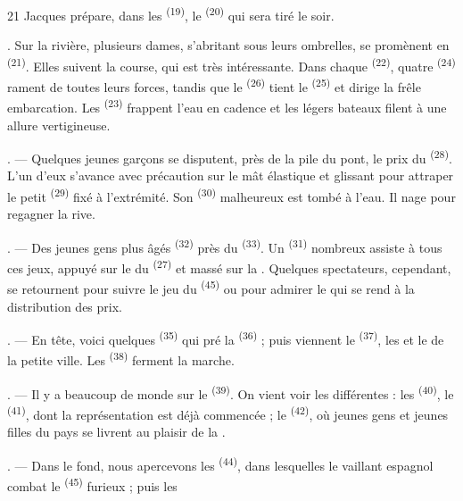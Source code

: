 \begin{VUpage}[23]{21}
\VUcontinue
Jacques prépare, dans les  \textsuperscript{(19)}, le \nl
{} \textsuperscript{(20)} qui sera tiré le soir.

. Sur la rivière, plusieurs dames, s'abritant sous\nl
leurs ombrelles, se promènent en  \textsuperscript{(21)}. Elles\nl
suivent la course, qui est très intéressante. Dans chaque\nl
{} \textsuperscript{(22)}, quatre  \textsuperscript{(24)} rament de toutes leurs\nl
forces, tandis que le  \textsuperscript{(26)} tient le \cc
{} \textsuperscript{(25)} et dirige la frêle embarcation. Les  \textsuperscript{(23)}\nl
frappent l'eau en cadence et les légers bateaux filent\nl
à une allure vertigineuse.

. --- Quelques jeunes garçons se disputent, près de\nl
la pile du pont, le prix du \textsuperscript{(28)}. L'un\nl
d'eux s'avance avec précaution sur le mât élastique\nl
et glissant pour attraper le petit  \textsuperscript{(29)} fixé à\nl
l'extrémité. Son  \textsuperscript{(30)} malheureux est tombé\nl
à l'eau. Il nage pour regagner la rive.

. --- Des jeunes gens plus âgés  \textsuperscript{(32)} près\nl
du  \textsuperscript{(33)}. Un  \textsuperscript{(31)} nombreux assiste à tous\nl
ces jeux, appuyé sur le  du \textsuperscript{(27)} et massé\nl
sur la . Quelques spectateurs, cependant, se\nl
retournent pour suivre le jeu du  \textsuperscript{(45)}\nl
ou pour admirer le  qui se rend\nl
à la distribution des prix.

. --- En tête, voici quelques  \textsuperscript{(35)} qui pré\cc
{} la  \textsuperscript{(36)} ; puis viennent le  \textsuperscript{(37)},\nl
les  et le  de la petite\nl
ville. Les  \textsuperscript{(38)} ferment la marche.

. --- Il y a beaucoup de monde sur le \nl
{} \textsuperscript{(39)}. On vient voir les différentes  :\nl
les  \textsuperscript{(40)}, le  \textsuperscript{(41)}, dont la\nl
représentation est déjà commencée ; le  \textsuperscript{(42)},\nl
où jeunes gens et jeunes filles du pays se livrent au\nl
plaisir de la .

. --- Dans le fond, nous apercevons les  \textsuperscript{(44)},\nl
dans lesquelles le vaillant  espagnol combat\nl
le  \textsuperscript{(45)} furieux ; puis les 
\parplein
\end{VUpage}

